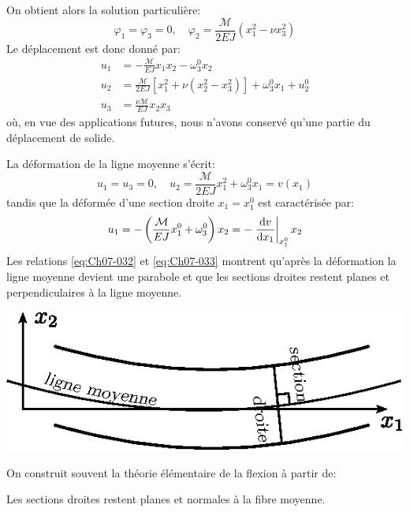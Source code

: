 On obtient alors la solution particulière:
\begin{equation}
    \varphi_1 = \varphi_3 = 0, \quad \varphi_2 = \frac{\mathcal{M}}{2EJ} \left( x_1^2 - \nu x_3^2 \right)
    \label{eq:Ch07-030}
\end{equation}
Le déplacement est donc donné par:
\begin{equation}
    \begin{aligned}
        u_1 & = -\frac{\mathcal{M}}{EJ} x_1x_2 -\omega_3^0x_2 \\
        u_2 & = \frac{\mathcal{M}}{2EJ} \left[ x_1^2 + \nu \left( x_2^2 - x_3^2 \right) \right] +\omega_3^0x_1 +u_2^0 \\
        u_3 & = \frac{\nu\mathcal{M}}{EJ} x_2x_3
    \end{aligned}
    \label{eq:Ch07-031}
\end{equation}
où, en vue des applications futures, nous n'avons conservé qu'une partie du déplacement de solide.

La déformation de la ligne moyenne s'écrit:
\begin{equation}
    u_1 = u_3 = 0, \quad u_2 = \frac{\mathcal{M}}{2EJ}x_1^2 + \omega_3^0 x_1 = v(x_1)
    \label{eq:Ch07-032}
\end{equation}
tandis que la déformée d'une section droite $x_1=x_1^0$ est caractérisée par:
\begin{equation}
    u_1 = - \left( \frac{\mathcal{M}}{EJ}x_1^0 + \omega_3^0 \right) x_2 = - \left.\frac{\mathop{\mathrm{{}d}}\mathopen{} v}{\mathop{\mathrm{{}d}}\mathopen{} x_1}\right|_{x_1^0} x_2
    \label{eq:Ch07-033}
\end{equation}
Les relations \eqref{eq:Ch07-032} et \eqref{eq:Ch07-033} montrent qu'après la déformation la ligne moyenne devient une parabole et que les sections droites restent planes et perpendiculaires à la ligne moyenne.

\begin{center}
    \includegraphics{../images/T1_Ch07-06}
\end{center}

On construit souvent la théorie élémentaire de la flexion à partir de:
\begin{Hypothese}
    Les sections droites restent planes et normales à la fibre moyenne.
\end{Hypothese}

